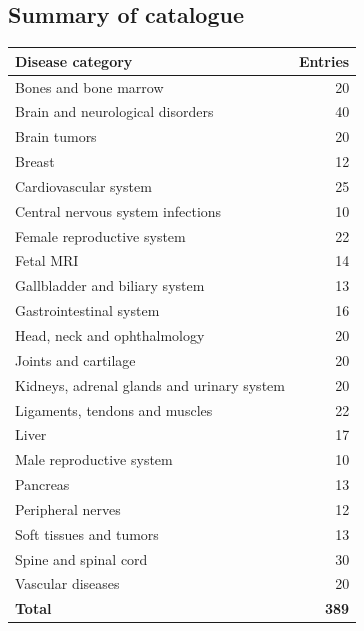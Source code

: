 \subsection{Summary of catalogue}
\begin{center}
\begin{tabular}{@{}p{}r@{}}
\toprule
\textbf{Disease category} & \textbf{Entries} \\
\midrule
Bones and bone marrow & 20 \\
Brain and neurological disorders & 40 \\
Brain tumors & 20 \\
Breast & 12 \\
Cardiovascular system & 25 \\
Central nervous system infections & 10 \\
Female reproductive system & 22 \\
Fetal MRI & 14 \\
Gallbladder and biliary system & 13 \\
Gastrointestinal system & 16 \\
Head, neck and ophthalmology & 20 \\
Joints and cartilage & 20 \\
Kidneys, adrenal glands and urinary system & 20 \\
Ligaments, tendons and muscles & 22 \\
Liver & 17 \\
Male reproductive system & 10 \\
Pancreas & 13 \\
Peripheral nerves & 12 \\
Soft tissues and tumors & 13 \\
Spine and spinal cord & 30 \\
Vascular diseases & 20 \\
\midrule
\textbf{Total} & \textbf{389} \\
\bottomrule
\end{tabular}
\end{center}

